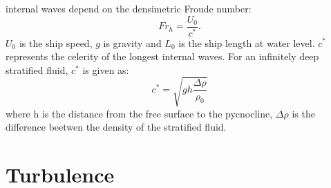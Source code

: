 \documentclass[a4paper, 12pt]{report}
\begin{document}
internal waves depend on the densimetric Froude number:
\begin{equation}
Fr_h = \frac{U_0}{c^*}.
\label{eqn:densimetricFroudeNumber}
\end{equation}
$U_0$ is the ship speed, $g$ is gravity and $L_0$ is the ship length at water level. $c^*$ represents the celerity of the longest internal waves. For an infinitely deep stratified fluid, $c^*$ is given as:
\begin{equation}
c^* = \sqrt{gh\frac{\Delta \rho}{\rho_0}}
\label{eqn:celerityWaves}
\end{equation} 
where h is the distance from the free surface to the pycnocline, $\Delta \rho$ is the difference beetwen the density of the stratified fluid.
\section{Turbulence}
\end{document}
